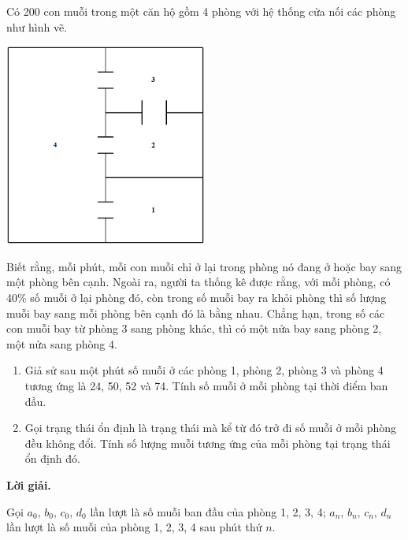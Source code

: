 \begin{tcolorbox}[title=\textbf{Bài toán B.3.},breakable]
    Có 200 con muỗi trong một căn hộ gồm 4 phòng với hệ thống cửa nối các phòng như hình vẽ.

    \begin{center}
        \includegraphics[width=0.5\textwidth]{Figures/01.png}
    \end{center}
    
    Biết rằng, mỗi phút, mỗi con muỗi chỉ ở lại trong phòng nó đang ở hoặc bay sang một phòng bên cạnh. Ngoài ra, người ta thống kê được rằng, với mỗi phòng, có 40\% số muỗi ở lại phòng đó, còn trong số muỗi bay ra khỏi phòng thì số lượng muỗi bay sang mỗi phòng bên cạnh đó là bằng nhau. Chẳng hạn, trong số các con muỗi bay từ phòng 3 sang phòng khác, thì có một nửa bay sang phòng 2, một nửa sang phòng 4.
    
    \begin{enumerate}
            \item {Giả sử sau một phút số muỗi ở các phòng 1, phòng 2, phòng 3 và phòng 4 tương ứng là 24, 50, 52 và 74. Tính số muỗi ở mỗi phòng tại thời điểm ban đầu.}
            \item {Gọi trạng thái ổn định là trạng thái mà kể từ đó trở đi số muỗi ở mỗi phòng đều không đổi. Tính số lượng muỗi tương ứng của mỗi phòng tại trạng thái ổn định đó.}         
    \end{enumerate}
\end{tcolorbox}

\textbf{Lời giải.}

Gọi $a_0,\,b_0,\,c_0,\,d_0$ lần lượt là số muỗi ban đầu của phòng 1, 2, 3, 4; $a_n,\,b_n,\,c_n,\,d_n$ lần lượt là số muỗi của phòng 1, 2, 3, 4 sau phút thứ $n$.

